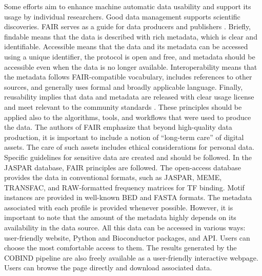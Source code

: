     Some efforts aim to enhance machine automatic data usability and support its usage by individual researchers. Good data management supports scientific discoveries. \ac{FAIR} serves as a guide for data producers and publishers \cite{wilkinson2016fair}. Briefly, findable means that the data is described with rich metadata, which is clear and identifiable. Accessible means that the data and its metadata can be accessed using a unique identifier, the protocol is open and free, and metadata should be accessible even when the data is no longer available. Interoperability means that the metadata follows FAIR-compatible vocabulary, includes references to other sources, and generally uses formal and broadly applicable language. Finally, reusability implies that data and metadata are released with clear usage license and meet relevant to the community standards \cite{wilkinson2016fair}. These principles should be applied also to the algorithms, tools, and workflows that were used to produce the data. The authors of FAIR emphasize that beyond high-quality data production, it is important to include a notion of ``long-term care'' of digital assets. The care of such assets includes ethical considerations for personal data. Specific guidelines for sensitive data are created and should be followed. In the JASPAR database, FAIR principles are followed. The open-access database provides the data in conventional formats, such as JASPAR, MEME, TRANSFAC, and RAW-formatted frequency matrices for TF binding. Motif instances are provided in well-known BED and FASTA formats. The metadata associated with each profile is provided whenever possible. However, it is important to note that the amount of the metadata highly depends on its availability in the data source. All this data can be accessed in various ways: user-friendly website, Python and Bioconductor packages, and API. Users can choose the most comfortable access to them. The results generated by the COBIND pipeline are also freely available as a user-friendly interactive webpage. Users can browse the page directly and download associated data.

